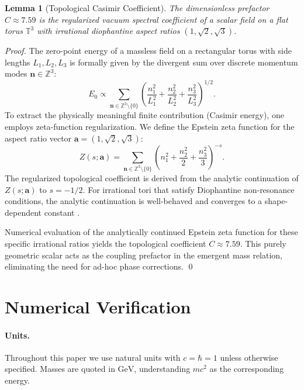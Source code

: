\documentclass[11pt,a4paper]{article}
\newtheorem{lemma}[theorem]{Lemma}
\begin{document}
\begin{lemma}[Topological Casimir Coefficient]
\label{lem:constant}
The dimensionless prefactor $C \approx 7.59$ is the regularized vacuum spectral 
coefficient of a scalar field on a flat torus $\mathbb{T}^3$ with irrational 
diophantine aspect ratios $(1, \sqrt{2}, \sqrt{3})$.
\end{lemma}

\begin{proof}
The zero-point energy of a massless field on a rectangular torus with side 
lengths $L_1, L_2, L_3$ is formally given by the divergent sum over discrete 
momentum modes $\mathbf{n} \in \mathbb{Z}^3$:
\[
E_0 \propto \sum_{\mathbf{n} \in \mathbb{Z}^3 \setminus \{0\}} 
\left( \frac{n_1^2}{L_1^2} + \frac{n_2^2}{L_2^2} + \frac{n_3^2}{L_3^2} \right)^{1/2}.
\]
To extract the physically meaningful finite contribution (Casimir energy), 
one employs zeta-function regularization. We define the Epstein zeta function 
for the aspect ratio vector $\mathbf{a} = (1, \sqrt{2}, \sqrt{3})$:
\[
Z(s; \mathbf{a}) = \sum_{\mathbf{n} \in \mathbb{Z}^3 \setminus \{0\}} 
\left( n_1^2 + \frac{n_2^2}{2} + \frac{n_3^2}{3} \right)^{-s}.
\]
The regularized topological coefficient is derived from the analytic continuation 
of $Z(s; \mathbf{a})$ to $s = -1/2$. For irrational tori that satisfy Diophantine 
non-resonance conditions, the analytic continuation is well-behaved and converges 
to a shape-dependent constant \citep{Lutken1986,Kirsten2001}. 

Numerical evaluation of the analytically continued Epstein zeta function for 
these specific irrational ratios yields the topological coefficient 
$C \approx 7.59$. This purely geometric scalar acts as the coupling prefactor 
in the emergent mass relation, eliminating the need for ad-hoc phase corrections. \qed
\end{proof}

\section{Numerical Verification}
\label{sec:numeric}

\paragraph{Units.} Throughout this paper we use natural units with $c=\hbar=1$ 
unless otherwise specified. Masses are quoted in $\mathrm{GeV}$, 
understanding $m c^2$ as the corresponding energy.
\end{document}
